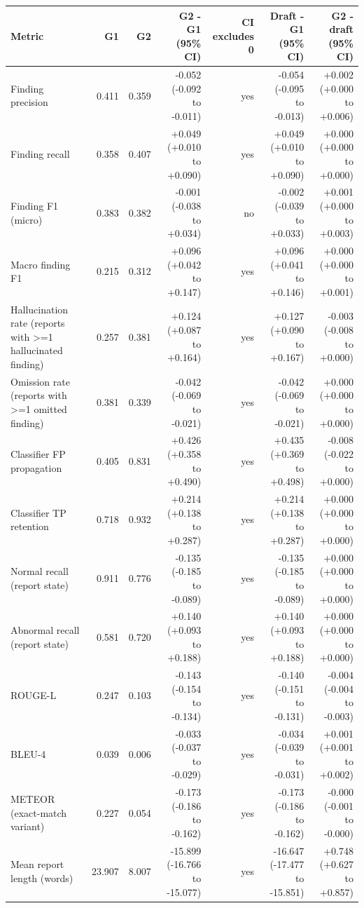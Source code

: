\begin{table}[t]
\centering
\scriptsize
\begin{tabular}{lrrrrrr}
\hline
Metric & G1 & G2 & G2 - G1 (95\% CI) & CI excludes 0 & Draft - G1 (95\% CI) & G2 - draft (95\% CI) \\
\hline
Finding precision & 0.411 & 0.359 & -0.052 (-0.092 to -0.011) & yes & -0.054 (-0.095 to -0.013) & +0.002 (+0.000 to +0.006) \\
Finding recall & 0.358 & 0.407 & +0.049 (+0.010 to +0.090) & yes & +0.049 (+0.010 to +0.090) & +0.000 (+0.000 to +0.000) \\
Finding F1 (micro) & 0.383 & 0.382 & -0.001 (-0.038 to +0.034) & no & -0.002 (-0.039 to +0.033) & +0.001 (+0.000 to +0.003) \\
Macro finding F1 & 0.215 & 0.312 & +0.096 (+0.042 to +0.147) & yes & +0.096 (+0.041 to +0.146) & +0.000 (+0.000 to +0.001) \\
Hallucination rate (reports with >=1 hallucinated finding) & 0.257 & 0.381 & +0.124 (+0.087 to +0.164) & yes & +0.127 (+0.090 to +0.167) & -0.003 (-0.008 to +0.000) \\
Omission rate (reports with >=1 omitted finding) & 0.381 & 0.339 & -0.042 (-0.069 to -0.021) & yes & -0.042 (-0.069 to -0.021) & +0.000 (+0.000 to +0.000) \\
Classifier FP propagation & 0.405 & 0.831 & +0.426 (+0.358 to +0.490) & yes & +0.435 (+0.369 to +0.498) & -0.008 (-0.022 to +0.000) \\
Classifier TP retention & 0.718 & 0.932 & +0.214 (+0.138 to +0.287) & yes & +0.214 (+0.138 to +0.287) & +0.000 (+0.000 to +0.000) \\
Normal recall (report state) & 0.911 & 0.776 & -0.135 (-0.185 to -0.089) & yes & -0.135 (-0.185 to -0.089) & +0.000 (+0.000 to +0.000) \\
Abnormal recall (report state) & 0.581 & 0.720 & +0.140 (+0.093 to +0.188) & yes & +0.140 (+0.093 to +0.188) & +0.000 (+0.000 to +0.000) \\
ROUGE-L & 0.247 & 0.103 & -0.143 (-0.154 to -0.134) & yes & -0.140 (-0.151 to -0.131) & -0.004 (-0.004 to -0.003) \\
BLEU-4 & 0.039 & 0.006 & -0.033 (-0.037 to -0.029) & yes & -0.034 (-0.039 to -0.031) & +0.001 (+0.001 to +0.002) \\
METEOR (exact-match variant) & 0.227 & 0.054 & -0.173 (-0.186 to -0.162) & yes & -0.173 (-0.186 to -0.162) & -0.000 (-0.001 to -0.000) \\
Mean report length (words) & 23.907 & 8.007 & -15.899 (-16.766 to -15.077) & yes & -16.647 (-17.477 to -15.851) & +0.748 (+0.627 to +0.857) \\

\end{tabular}
\end{table}
